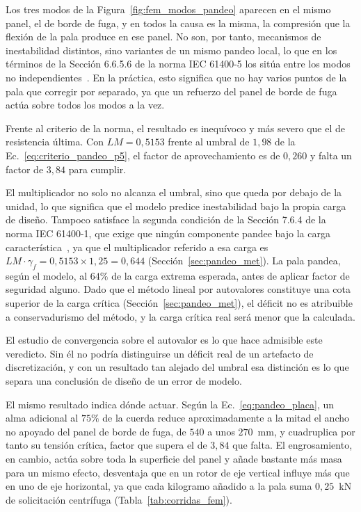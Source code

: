 Los tres modos de la Figura~\ref{fig:fem_modos_pandeo} aparecen en el mismo panel, el de borde de fuga, y en todos la causa es la misma, la compresión que la flexión de la pala produce en ese panel. No son, por tanto, mecanismos de inestabilidad distintos, sino variantes de un mismo pandeo local, lo que en los términos de la Sección 6.6.5.6 de la norma IEC 61400-5 los sitúa entre los modos no independientes~\parencite*{IEC61400-5}. En la práctica, esto significa que no hay varios puntos de la pala que corregir por separado, ya que un refuerzo del panel de borde de fuga actúa sobre todos los modos a la vez.

Frente al criterio de la norma, el resultado es inequívoco y más severo que el de resistencia última. Con $LM = 0{,}5153$ frente al umbral de $1{,}98$ de la Ec.~\ref{eq:criterio_pandeo_p5}, el factor de aprovechamiento es de $0{,}260$ y falta un factor de $3{,}84$ para cumplir.

El multiplicador no solo no alcanza el umbral, sino que queda por debajo de la unidad, lo que significa que el modelo predice inestabilidad bajo la propia carga de diseño. Tampoco satisface la segunda condición de la Sección 7.6.4 de la norma IEC 61400-1, que exige que ningún componente pandee bajo la carga característica~\parencite*{IEC61400-1}, ya que el multiplicador referido a esa carga es $LM \cdot \gamma_f = 0{,}5153 \times 1{,}25 = 0{,}644$ (Sección~\ref{sec:pandeo_met}). La pala pandea, según el modelo, al $64\%$ de la carga extrema esperada, antes de aplicar factor de seguridad alguno. Dado que el método lineal por autovalores constituye una cota superior de la carga crítica (Sección~\ref{sec:pandeo_met}), el déficit no es atribuible a conservadurismo del método, y la carga crítica real será menor que la calculada.

El estudio de convergencia sobre el autovalor es lo que hace admisible este veredicto. Sin él no podría distinguirse un déficit real de un artefacto de discretización, y con un resultado tan alejado del umbral esa distinción es lo que separa una conclusión de diseño de un error de modelo.

El mismo resultado indica dónde actuar. Según la Ec.~\ref{eq:pandeo_placa}, un alma adicional al $75\%$ de la cuerda reduce aproximadamente a la mitad el ancho no apoyado del panel de borde de fuga, de $540$ a unos $270$~mm, y cuadruplica por tanto su tensión crítica, factor que supera el de $3{,}84$ que falta. El engrosamiento, en cambio, actúa sobre toda la superficie del panel y añade bastante más masa para un mismo efecto, desventaja que en un rotor de eje vertical influye más que en uno de eje horizontal, ya que cada kilogramo añadido a la pala suma $0{,}25$~kN de solicitación centrífuga (Tabla~\ref{tab:corridas_fem}).

